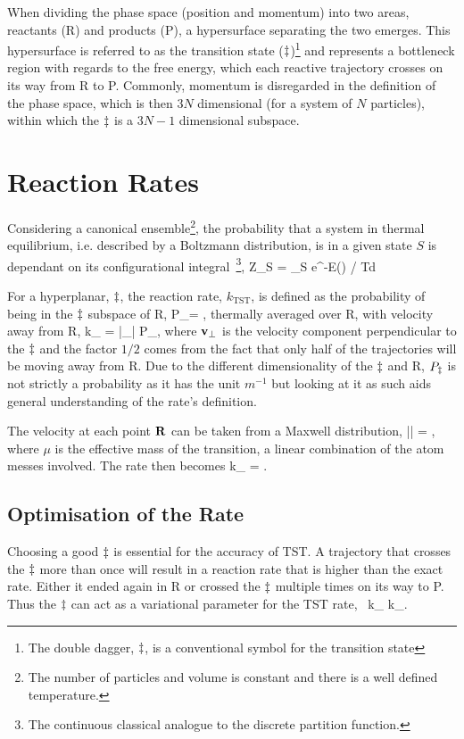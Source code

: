 When dividing the phase space (position and momentum) into two areas, reactants (R) and products (P), a hypersurface separating the two emerges.
This hypersurface is referred to as the transition state ($\ddagger$)\footnote{The double dagger, $\ddagger$, is a conventional symbol for the transition state} and represents a bottleneck region with regards to the free energy, which each reactive trajectory crosses on its way from R to P.
Commonly, momentum is disregarded in the definition of the phase space, which is then $3N$ dimensional (for a system of $N$ particles), within which the $\ddagger$ is a $3N-1$ dimensional subspace.

\section{Reaction Rates}
Considering a canonical ensemble\footnote{The number of particles and volume is constant and there is a well defined temperature.}, the probability that a system in thermal equilibrium, i.e. described by a Boltzmann distribution, is in a given state $S$ is dependant on its configurational integral~\footnote{The continuous classical analogue to the discrete partition function.},
Z_S = \int_S e^{-E(\vR) / \kB T}d\vR
\eeq

For a hyperplanar, $\ddagger$, the reaction rate, $k_\text{TST}$, is defined as the probability of being in the $\ddagger$ subspace of $\text{R}$,
P_\ts = ,
\eeq
thermally averaged over R, with velocity away from R,
k_ = |_\perp| P_\ts,
\eeq
where ${\mathrm{\mathbf{\bm{v}}}}_\perp$ is the velocity component perpendicular to the $\ddagger$ and the factor $1/2$ comes from the fact that only half of the trajectories will be moving away from R.
Due to the different dimensionality of the $\ddagger$ and R, $P_\ddagger$ is not strictly a probability as it has the unit $\unit{m^{-1}}$ but looking at it as such aids general understanding of the rate's definition.

The velocity at each point ${\mathrm{\mathbf{\bm{R}}}}$ can be taken from a Maxwell distribution,
\langle || \rangle = ,
\eeq
where $\mu$ is the effective mass of the transition, a linear combination of the atom messes involved.
The rate then becomes
k_ =  .
\eeq

\subsection{Optimisation of the Rate}
Choosing a good $\ddagger$ is essential for the accuracy of TST.
A trajectory that crosses the $\ddagger$ more than once will result in a reaction rate that is higher than the exact rate.
Either it ended again in R or crossed the $\ddagger$ multiple times on its way to P.
Thus the $\ddagger$ can act as a variational parameter for the TST rate,~\cite{vtst-1938, vtst-review-1984, vtst-2005}
k_ \ge k_.
\eeq

